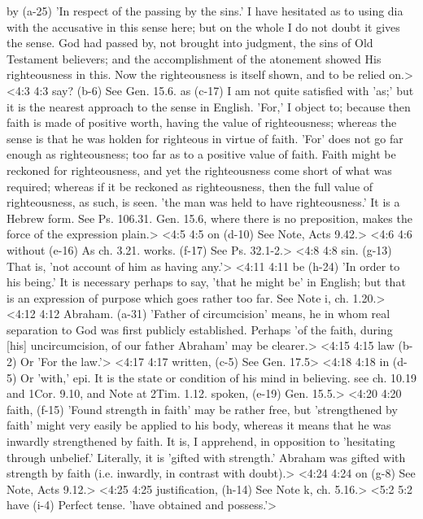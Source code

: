   by (a-25)  'In respect of the passing by the sins.' I have hesitated as  to using dia with the accusative in this sense here; but on  the whole I do not doubt it gives the sense. God had passed by,  not brought into judgment, the sins of Old Testament believers;  and the accomplishment of the atonement showed His  righteousness in this. Now the righteousness is itself shown,  and to be relied on.>
<4:3 4:3  say? (b-6)  See Gen. 15.6.
  as (c-17)  I am not quite satisfied with 'as;' but it is the nearest  approach to the sense in English. 'For,' I object to; because  then faith is made of positive worth, having the value of  righteousness; whereas the sense is that he was holden for  righteous in virtue of faith. 'For' does not go far enough as  righteousness; too far as to a positive value of faith. Faith  might be reckoned for righteousness, and yet the righteousness  come short of what was required; whereas if it be reckoned as  righteousness, then the full value of righteousness, as such,  is seen. 'the man was held to have righteousness.' It is a  Hebrew form. See Ps. 106.31. Gen. 15.6, where there is no  preposition, makes the force of the expression plain.>
<4:5 4:5  on (d-10)  See Note, Acts 9.42.>
<4:6 4:6  without (e-16)  As ch. 3.21.
  works. (f-17)  See Ps. 32.1-2.>
<4:8 4:8  sin. (g-13)  That is, 'not account of him as having any.'>
<4:11 4:11  be (h-24)  'In order to his being.' It is necessary perhaps to say,  'that he might be' in English; but that is an expression of  purpose which goes rather too far. See Note i, ch. 1.20.>
<4:12 4:12  Abraham. (a-31)  'Father of circumcision' means, he in whom real separation to  God was first publicly established. Perhaps 'of the faith,  during [his] uncircumcision, of our father Abraham' may be  clearer.>
<4:15 4:15  law (b-2)  Or 'For the law.'>
<4:17 4:17  written, (c-5)  See Gen. 17.5>
<4:18 4:18  in (d-5)  Or 'with,' epi. It is the state or condition of his mind in  believing. see ch. 10.19 and 1Cor. 9.10, and Note at 2Tim. 1.12.
  spoken, (e-19)  Gen. 15.5.>
<4:20 4:20  faith, (f-15)  'Found strength in faith' may be rather free, but  'strengthened by faith' might very easily be applied to his  body, whereas it means that he was inwardly strengthened by  faith. It is, I apprehend, in opposition to 'hesitating through  unbelief.' Literally, it is 'gifted with strength.' Abraham was  gifted with strength by faith (i.e. inwardly, in contrast with  doubt).>
<4:24 4:24  on (g-8)  See Note, Acts 9.12.>
<4:25 4:25  justification, (h-14)  See Note k, ch. 5.16.>
<5:2 5:2  have (i-4)  Perfect tense. 'have obtained and possess.'>
